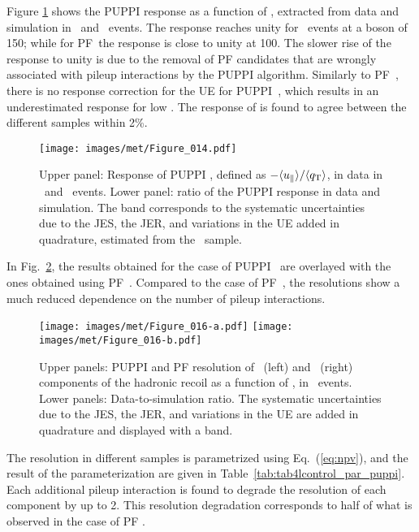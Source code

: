Figure \ref{fig:response_puppi} shows the PUPPI \ptmiss response as a function of \qt, extracted from data and simulation in \Zmm\ and \Zee\ events. 
The response reaches unity for \Zmm\ events at a boson \pt of 150\GeV; while for PF~\ptmiss the response is close to unity at 100\GeV. 
The slower rise of the response to unity is due to the removal of PF candidates that are wrongly associated with pileup interactions by the PUPPI algorithm. 
Similarly to PF~\ptmiss, there is no response correction for the UE for PUPPI~\ptmiss, which results in an underestimated response for low \qt. 
The response of \ptmiss is found to agree between the different samples  within 2\%. 
\begin{figure}[!htp]
  \centering
   \texttt{[image: images/met/Figure\_014.pdf]}
  \caption{Upper panel: Response of PUPPI \ptmiss, defined as $-\langle u_\Vert \rangle /\langle {q}_{\mathrm T} \rangle$, in data in \Zmm\ and \Zee\ events. Lower panel: ratio of the PUPPI \ptmiss response in data and simulation. The band corresponds to the systematic uncertainties due to the JES, the JER, and variations in the UE added in quadrature, estimated from the \Zee\ sample.}
  \label{fig:response_puppi}
\end{figure}
In Fig.~\ref{fig:Res_vs_PileUpHighPU}, the results obtained for the case of PUPPI \ptmiss\ are overlayed with the ones obtained using PF~\ptmiss. 
Compared to the case of PF~\ptmiss, the resolutions show a much reduced dependence on the number of pileup interactions.
\begin{figure}[!htp]
  \centering
   \texttt{[image: images/met/Figure\_016-a.pdf]}
   \texttt{[image: images/met/Figure\_016-b.pdf]}
   \caption{Upper panels: PUPPI and PF \ptmiss resolution of \upar\ (left) and \uperp\ (right) components of the hadronic recoil as a function of \nvtx, in \Zmm\ events. Lower panels: Data-to-simulation ratio. The systematic uncertainties due to the JES, the JER, and variations in the UE are added in quadrature and displayed with a band.}
   \label{fig:Res_vs_PileUpHighPU}
\end{figure}
The resolution in different samples is parametrized using Eq.~(\ref{eq:npv}), and the result of the parameterization are given in Table~\ref{tab:tab4lcontrol_par_puppi}. 
Each additional pileup interaction is found to degrade the resolution of each component by up to 2\GeV. This resolution degradation corresponds to half of what is observed in the case of PF \ptmiss.
